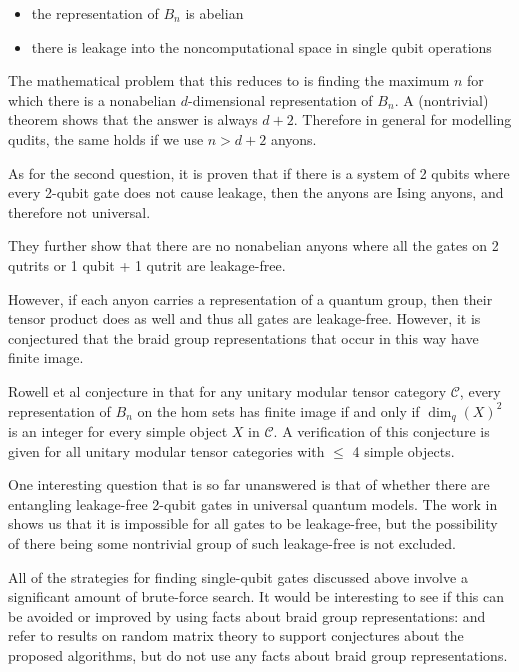 \begin{itemize}
\item the representation of $B_n$ is abelian
\item there is leakage into the noncomputational space in single qubit operations
\end{itemize}

The mathematical problem that this reduces to is finding the maximum $n$ for
which there is a nonabelian $d$-dimensional representation of $B_n$. A
(nontrivial) theorem shows that the answer is always $d+2$.
Therefore in general for modelling qudits, the same holds if we use $n > d+2$ anyons.

As for the second question, it is proven that if there is a system of 2 qubits
where every 2-qubit gate does not cause leakage, then the anyons are Ising
anyons, and therefore not universal.

They further show that there are no nonabelian anyons where all the gates on 2
qutrits or 1 qubit + 1 qutrit are leakage-free.

However, if each anyon carries a representation of a quantum group, then their
tensor product does as well and thus all gates are leakage-free. However, it is
conjectured that the braid group representations that occur in this way have
finite image.

Rowell et al conjecture in \cite{Rowell2007} that for any unitary modular
tensor category $\mathcal{C}$, every representation of $B_n$ on the hom sets
has finite image if and only if $\dim_q(X)^2$ is an integer for every simple
object $X$ in $\mathcal{C}$. A verification of this conjecture is given for all
unitary modular tensor categories with $\leq$ 4 simple objects.
       
One interesting question that is so far unanswered is that of whether there are
entangling leakage-free 2-qubit gates in universal quantum models. The work in
\cite{Ainsworth2011} shows us that it is impossible for all gates to be
leakage-free, but the possibility of there being some nontrivial group of such
leakage-free is not excluded. 

All of the strategies for finding single-qubit gates discussed above involve a
significant amount of brute-force search. It would be interesting to see if
this can be avoided or improved by using facts about braid group
representations: \cite{Burrello2011} and \cite{Burrello2010} refer to results
on random matrix theory to support conjectures about the proposed algorithms,
but do not use any facts about braid group representations.
